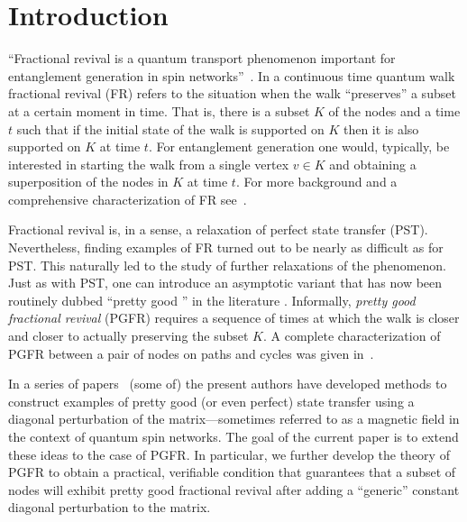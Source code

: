 \documentclass[11pt]{article}
\theoremstyle{definition}
\numberwithin{equation}{section}
\newcommand\+{\mkern2mu}
\newcommand{\1}{\mathbf 1}
\begin{document}
\section{Introduction}
``Fractional revival is a quantum transport phenomenon important for entanglement generation in spin networks''~\cite{ChanCoutinhoTamonVinetZhan}. In a continuous time quantum walk fractional revival (FR) refers to the situation when the walk ``preserves'' a subset at a certain moment in time. That is, there is a subset $K$ of the nodes and a time $t$ such that if the initial state of the walk is supported on $K$ then it is also supported on $K$ at time $t$. For entanglement generation one would, typically, be interested in starting the walk from a single vertex $v\in K$ and obtaining a superposition of the nodes in $K$ at time $t$. For more background and a comprehensive characterization of FR see~\cite{chan2020fundamentals}.

Fractional revival is, in a sense, a relaxation of perfect state transfer (PST). Nevertheless, finding examples of FR turned out to be nearly as difficult as for PST. This naturally led to the study of further relaxations of the phenomenon. Just as with PST, one can introduce an asymptotic variant that has now been routinely dubbed ``pretty good \underline{\phantom{PST}}'' in the literature \cite{Vinet2012,Godsil2012}. Informally, \emph{pretty good fractional revival} (PGFR) requires a sequence of times at which the walk is closer and closer to actually preserving the subset $K$. A complete characterization of PGFR between a pair of nodes on paths and cycles was given in~\cite{chan2020approximate}. 

In a series of papers~\cite{us, invol, eisenberg2019pretty} (some of) the present authors have developed methods to construct examples of pretty good (or even perfect) state transfer using a diagonal perturbation of the matrix---sometimes referred to as a magnetic field in the context of quantum spin networks. The goal of the current paper is to extend these ideas to the case of PGFR. In particular, we further develop the theory of PGFR to obtain a practical, verifiable condition that guarantees that a subset of nodes will exhibit pretty good fractional revival after adding a ``generic'' constant diagonal perturbation to the matrix. 
\end{document}
